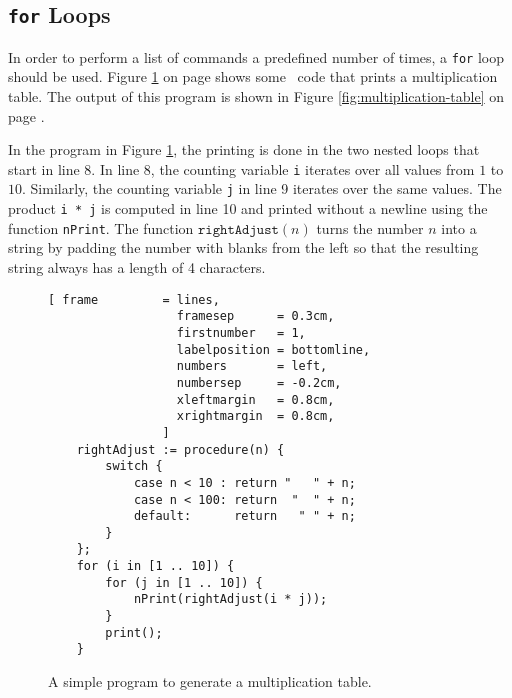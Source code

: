 \subsection{\texttt{for} Loops}
In order to perform a list of commands a predefined number of times, a \texttt{for} loop should  be
used.  Figure \ref{fig:multiplication-table.stlx} on page \pageref{fig:multiplication-table.stlx}
shows some \setlx\ code that prints a multiplication table.  The output of this program is
shown in Figure \ref{fig:multiplication-table} on page \pageref{fig:multiplication-table}.

In the program in Figure \ref{fig:multiplication-table.stlx}, the printing is done in the two nested
loops that start in line 8.  In line 8, the counting variable \texttt{i} iterates over all values
from $1$ to $10$.  Similarly, the counting variable \texttt{j} in line 9 iterates over the same values.
The product \texttt{i * j} is computed in line 10 and printed without a newline using the
function \texttt{nPrint}.
The function $\texttt{rightAdjust}(n)$ turns the number $n$ into a string by padding the
number with blanks from the left so that the resulting string always has a length of 4 
characters.

\begin{figure}[!ht]
\centering
\begin{Verbatim}[ frame         = lines, 
                  framesep      = 0.3cm, 
                  firstnumber   = 1,
                  labelposition = bottomline,
                  numbers       = left,
                  numbersep     = -0.2cm,
                  xleftmargin   = 0.8cm,
                  xrightmargin  = 0.8cm,
                ]
    rightAdjust := procedure(n) {
        switch {
            case n < 10 : return "   " + n;
            case n < 100: return  "  " + n;
            default:      return   " " + n;
        }
    };      
    for (i in [1 .. 10]) {
        for (j in [1 .. 10]) {
            nPrint(rightAdjust(i * j));
        }
        print();
    }
\end{Verbatim}
\vspace*{-0.3cm}
\caption{A simple program to generate a multiplication table.}
\label{fig:multiplication-table.stlx}
\end{figure}

